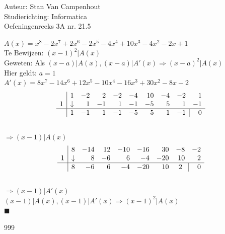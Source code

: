 \documentclass[a4paper]{article}
\begin{document}
  
\noindent \large Auteur: Stan Van Campenhout \\
\noindent \large Studierichting:  Informatica\\
\noindent \large Oefeningenreeks 3A nr. 21.5\\

\medskip

\normalsize

$ A(x) = x^8 - 2x^7 +2x^6 - 2x^5 - 4x^4 + 10x^3 - 4x^2 - 2x + 1 $\\

Te Bewijzen: $ (x - 1)^2 | A(x) $\\

Geweten: Als $ (x - a) | A(x), (x - a) | A'(x) \Rightarrow (x - a)^2 | A(x) $\\

Hier geldt: $ a = 1 $\\

$ A'(x) = 8x^7 - 14x^6 + 12x^5 - 10x^4 - 16x^3 + 30x^2 - 8x - 2 $\\

 $$ \begin{array}{c|rrrrrrrrr}     
&1 &-2 &2 &-2 &-4 &10 &-4 &-2 &1  \\  
1 & \downarrow  &1 &-1 &1 &-1 &-5 &5 &1 &-1 \\ \hline
 &1 &-1 &1 &-1 &-5 &5 &1 & \multicolumn{1}{c|}{-1}  &0
\end{array} $$ \\

$ \Rightarrow  (x - 1) | A(x) $\\

 $$ \begin{array}{c|rrrrrrrr}     
&8 &-14 &12 &-10 &-16 &30 &-8 &-2  \\  
1 & \downarrow  &8 &-6 &6 &-4 &-20 &10 &2 \\ \hline
 &8 &-6 &6 &-4 &-20 &10 & \multicolumn{1}{c|}{2}  &0
\end{array} $$ \\

$ \Rightarrow  (x - 1) | A'(x) $\\

$  (x - 1) | A(x), (x - 1) | A'(x) \Rightarrow (x - 1)^2 | A(x) $\\ 

$ \blacksquare $\\

\begin{thebibliography}{999}
\end{thebibliography}
\end{document}
